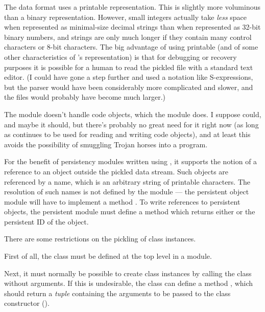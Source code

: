 The  data format uses a printable \ASCII{} representation.
This is slightly more voluminous than a binary representation.
However, small integers actually take {\em less} space when
represented as minimal-size decimal strings than when represented as
32-bit binary numbers, and strings are only much longer if they
contain many control characters or 8-bit characters.  The big
advantage of using printable \ASCII{} (and of some other characteristics
of 's representation) is that for debugging or recovery
purposes it is possible for a human to read the pickled file with a
standard text editor.  (I could have gone a step further and used a
notation like S-expressions, but the parser would have been
considerably more complicated and slower, and the files would probably
have become much larger.)

The  module doesn't handle code objects, which the
 module does.  I suppose  could, and maybe
it should, but there's probably no great need for it right now (as
long as  continues to be used for reading and writing
code objects), and at least this avoids the possibility of smuggling
Trojan horses into a program.

For the benefit of persistency modules written using , it
supports the notion of a reference to an object outside the pickled
data stream.  Such objects are referenced by a name, which is an
arbitrary string of printable \ASCII{} characters.  The resolution of
such names is not defined by the  module --- the
persistent object module will have to implement a method
.  To write references to persistent objects,
the persistent module must define a method  which
returns either  or the persistent ID of the object.

There are some restrictions on the pickling of class instances.

First of all, the class must be defined at the top level in a module.

\renewcommand{\indexsubitem}{(pickle protocol)}

Next, it must normally be possible to create class instances by
calling the class without arguments.  If this is undesirable, the
class can define a method , which should
return a {\em tuple} containing the arguments to be passed to the
class constructor ().

